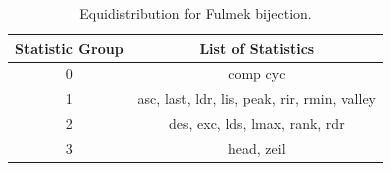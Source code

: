 \documentclass[12pt]{article}
\begin{document}
\begin{table}[H]
\caption{Equidistribution for Fulmek bijection.}
\centering
\begin{tabular}{c | c}
\hline\hline
Statistic Group & List of Statistics \\ [0.5ex]
\hline
0 & {comp cyc} \\
1 & {asc, last, ldr, lis, peak, rir, rmin, valley} \\
2 & {des, exc, lds, lmax, rank, rdr} \\
3 & {head, zeil} 
\hline
\end{tabular}
\label{table:EDFulmekPerms}
\end{table}
\newpage
\end{document}
